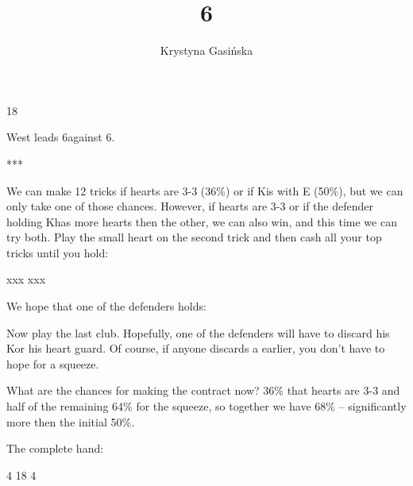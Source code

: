 \documentclass[12pt, a4paper]{article}
\title{6\nt}
\author{Krystyna Gasińska}
\begin{document}
\maketitle

        {}{}
        {}{18}
        {}{}
        {}

West leads 6\diams against 6\nt.
\begin{center}
    ***
\end{center}
We can make 12 tricks if hearts are 3-3 (36\%) or
if K\spades is with E (50\%), but we can only take
one of those chances. However, if hearts are 3-3 or if the defender 
holding K\spades has more hearts then the other, we 
can also win, and this time
we can try both. Play the small heart on the second trick
and then cash all your top tricks 
until you hold:

        {xxx}{}
        {}{}
        {xxx}{}
        {}

We hope that one of the defenders holds:


Now play the last club. Hopefully, one of the defenders
will have to discard his
K\spades or his heart guard. Of course, if anyone discards
a \hearts earlier, you don't have to hope for a squeeze.

\vspace{0.2cm}

What are the chances for making the contract now?
36\% that hearts are 3-3 and half of the remaining
64\% for the squeeze, so together we have 68\% --
significantly more then the initial 50\%.

\vspace{0.2cm}

The complete hand:

        {}{4}
        {}{18}
        {}{4}
        {}
\end{document}
